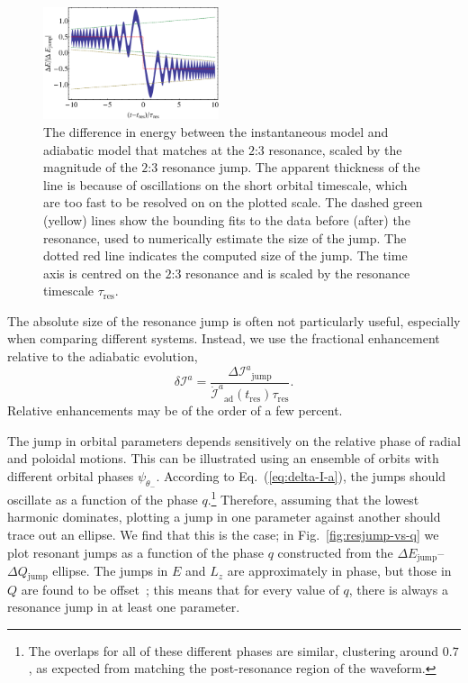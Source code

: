 \documentclass[aps,prd,amsfonts,amssymb,amsmath,nofootinbib,showpacs,superscriptaddress,twocolumn,floatfix]{revtex4-1}
\newcommand{\eqnref}[1]{Eq.~(\ref{eq:#1})}
\newcommand{\figref}[1]{Fig.~\ref{fig:#1}}
\newcommand{\sub}[1]{\ensuremath{_\mathrm{#1}}}
\begin{document}
\begin{figure}
\centering
\includegraphics[width=0.46\textwidth]{Fig_res_jump_calc}
\caption{\label{fig:res-jump-calc}The difference in energy between the instantaneous model and adiabatic model that matches at the $2$:$3$ resonance, scaled by the magnitude of the $2$:$3$ resonance jump. The apparent thickness of the line is because of oscillations on the short orbital timescale, which are too fast to be resolved on on the plotted scale. The dashed green (yellow) lines show the bounding fits to the data before (after) the resonance, used to numerically estimate the size of the jump. The dotted red line indicates the computed size of the jump. The time axis is centred on the $2$:$3$ resonance and is scaled by the resonance timescale $\tau\sub{res}$.}
\end{figure}

The absolute size of the resonance jump is often not particularly useful, especially when comparing different systems. Instead, we use the fractional enhancement relative to the adiabatic evolution,
\begin{equation}
\label{eq:res-jump-ratio}
\delta \mathcal{I}^a = \frac{\Delta \mathcal{I}^a\sub{jump}}{\dot{\mathcal{I}}^a\sub{ad}(t\sub{res})\tau\sub{res}}.
\end{equation}
Relative enhancements may be of the order of a few percent.

The jump in orbital parameters depends sensitively on the relative phase of radial and poloidal motions. This can be illustrated using an ensemble of orbits with different orbital phases $\psi_{\theta_-}$. According to \eqnref{delta-I-a}, the jumps should oscillate as a function of the phase $q$.\footnote{The overlaps for all of these different phases are similar, clustering around $0.7$, as expected from matching the post-resonance region of the waveform.} Therefore, assuming that the lowest harmonic dominates, plotting a jump in one parameter against another should trace out an ellipse. We find that this is the case; in \figref{resjump-vs-q} we plot resonant jumps as a function of the phase $q$ constructed from the $\Delta E\sub{jump}$--$\Delta Q\sub{jump}$ ellipse. The jumps in $E$ and $L_z$ are approximately in phase, but those in $Q$ are found to be offset~\cite{Flanagan2012a}; this means that for every value of $q$, there is always a resonance jump in at least one parameter.
\end{document}
